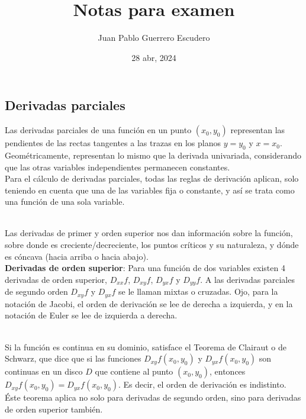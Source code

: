 \documentclass[12pt, letterpaper]{report}
\title{Notas para examen}
\author{Juan Pablo Guerrero Escudero}
\date{28 abr, 2024}
\begin{document}
\maketitle
\subsection*{Derivadas parciales}
Las derivadas parciales de una función en un punto $(x_0,y_0)$ representan las pendientes de las rectas 
tangentes a las trazas en los planos $y = y_0$ y $x = x_0$. Geométricamente, representan 
lo mismo que la derivada univariada, considerando que las otras variables independientes permanecen constantes. \\
Para el cálculo de derivadas parciales, todas las reglas de derivación aplican, solo teniendo en cuenta que una de las variables
fija o constante, y así se trata como una función de una sola variable. \\ 

Las derivadas de primer y orden superior nos dan información sobre la función, sobre donde es creciente/decreciente, los puntos 
críticos y su naturaleza, y dónde es cóncava (hacia arriba o hacia abajo). \\

\textbf{Derivadas de orden superior}: Para una función de dos variables existen 4 derivadas de orden superior, 
$D_{xx}f$, $D_{xy}f$, $D_{yx}f$ y $D_{yy}f$. A las derivadas parciales de segundo orden $D_{xy}f$ y $D_{yx}f$ se le llaman 
mixtas o cruzadas. Ojo, para la notación de Jacobi, el orden de derivación se lee de derecha a izquierda, y en la 
notación de Euler se lee de izquierda a derecha. \\ 

Si la función es continua en su dominio, satisface el Teorema de Clairaut o de Schwarz, que dice que si las funciones 
$D_{xy}f(x_0, y_0)$ y $D_{yx}f(x_0, y_0)$ son continuas en un disco $D$ que contiene al punto $(x_0, y_0)$, entonces 
$D_{xy}f(x_0, y_0) = D_{yx}f(x_0, y_0)$. Es decir, el orden de derivación es indistinto. Éste teorema aplica no solo para derivadas 
de segundo orden, sino para derivadas de orden superior también. 
\end{document}
